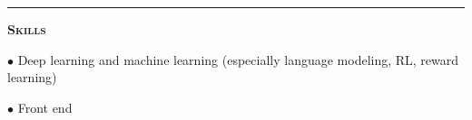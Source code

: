 \documentclass[11 pt]{article}
\begin{document}
\begin{comment}

\begin{center}\textbf{The Bishop's School, La Jolla, CA} \end{center} \vspace{-6 pt}

\textbf{Date of graduation}: May 2008, cum laude \hfill \textbf{GPA}: 4.66/5

\begin{small}

$\bullet$ National AP Scholar, 3$\times$ USAMO qualifier \hfill \textbf{ACT}: 34, \textbf{SAT}: 2230\\





\end{small}

\end{comment}
\hrule

\begin{center}\begin{Large}\textsc{\textbf{Skills}\\}\end{Large}\end{center}


$\bullet$ Deep learning and machine learning (especially language modeling, RL, reward learning)


$\bullet$ Front end %
\end{document}
